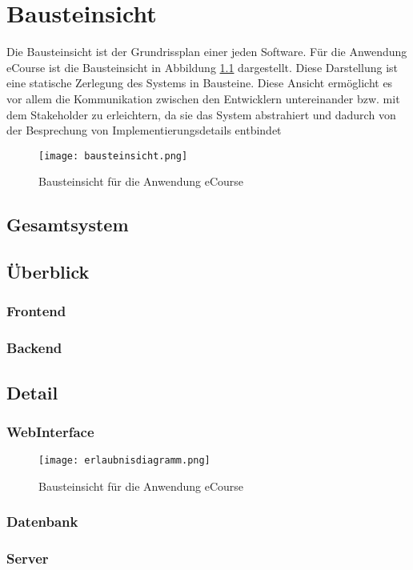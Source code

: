 \chapter{Bausteinsicht}
\label{sec:bausteine}
Die Bausteinsicht ist der Grundrissplan einer jeden Software. Für die Anwendung eCourse ist die Bausteinsicht in Abbildung \ref{fib:Bausteinsicht} dargestellt.
Diese Darstellung ist eine statische Zerlegung des Systems in Bausteine. Diese Ansicht ermöglicht es vor allem die Kommunikation zwischen den Entwicklern untereinander bzw. mit dem Stakeholder zu erleichtern, da sie das System abstrahiert und dadurch von der Besprechung von Implementierungsdetails entbindet

\begin{figure}[H]
\centering
\texttt{[image: bausteinsicht.png]}
\caption{Bausteinsicht für die Anwendung eCourse}
\label{fib:Bausteinsicht}
\end{figure}

\section{Gesamtsystem}



\section{Überblick}

\subsection{Frontend}

\subsection{Backend}

\section{Detail}

\subsection{WebInterface}
\begin{figure}[H]
\centering
\texttt{[image: erlaubnisdiagramm.png]}
\caption{Bausteinsicht für die Anwendung eCourse}
\label{fib:erlaubnis}
\end{figure}

\subsection{Datenbank}

\subsection{Server}